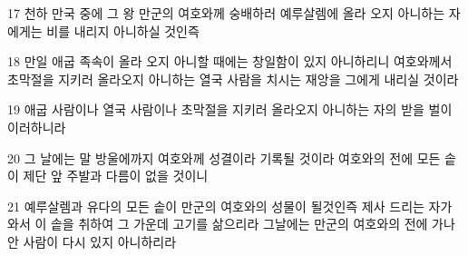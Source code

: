 \par 17 천하 만국 중에 그 왕 만군의 여호와께 숭배하러 예루살렘에 올라 오지 아니하는 자에게는 비를 내리지 아니하실 것인즉
\par 18 만일 애굽 족속이 올라 오지 아니할 때에는 창일함이 있지 아니하리니 여호와께서 초막절을 지키러 올라오지 아니하는 열국 사람을 치시는 재앙을 그에게 내리실 것이라
\par 19 애굽 사람이나 열국 사람이나 초막절을 지키러 올라오지 아니하는 자의 받을 벌이 이러하니라
\par 20 그 날에는 말 방울에까지 여호와께 성결이라 기록될 것이라 여호와의 전에 모든 솥이 제단 앞 주발과 다름이 없을 것이니
\par 21 예루살렘과 유다의 모든 솥이 만군의 여호와의 성물이 될것인즉 제사 드리는 자가 와서 이 솥을 취하여 그 가운데 고기를 삶으리라 그날에는 만군의 여호와의 전에 가나안 사람이 다시 있지 아니하리라


